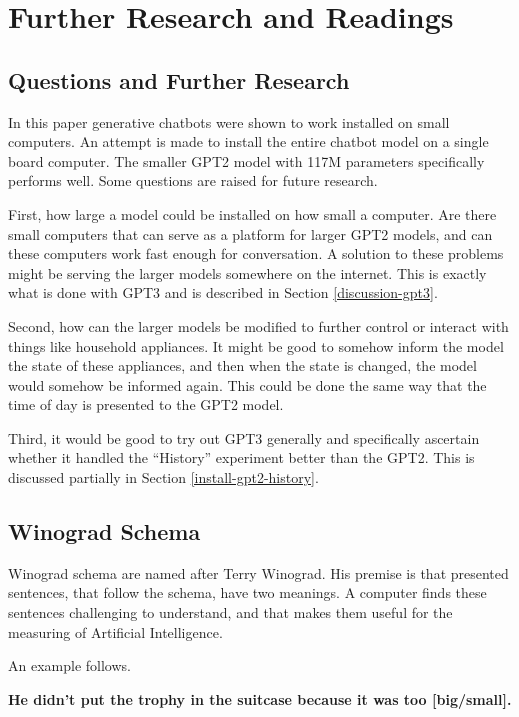\chapter{Further Research and Readings}

\section{Questions and Further Research}

In this paper generative chatbots were shown to work installed on small computers. An attempt is made to install the entire chatbot model on a single board computer. The smaller GPT2 model with 117M parameters specifically performs well. Some questions are raised for future research.

First, how large a model could be installed on how small a computer. Are there small computers that can serve as a platform for larger GPT2 models, and can these computers work fast enough for conversation. A solution to these problems might be serving the larger models somewhere on the internet. This is exactly what is done with GPT3 and is described in Section \ref{discussion-gpt3}.

Second, how can the larger models be modified to further control or interact with things like household appliances. It might be good to somehow inform the model the state of these appliances, and then when the state is changed, the model would somehow be informed again. This could be done the same way that the time of day is presented to the GPT2 model.

Third, it would be good to try out GPT3 generally and specifically ascertain whether it handled the ``History'' experiment better than the GPT2. This is discussed partially in Section \ref{install-gpt2-history}. 


\section{Winograd Schema}

Winograd schema are named after Terry Winograd. His premise is that presented sentences, that follow the schema, have two meanings. A computer finds these sentences challenging to understand, and that makes them useful for the measuring of Artificial Intelligence.

An example follows.

\begin{center}
	\textbf{He didn't put the trophy in the suitcase because it was too [big/small].}
\end{center}

